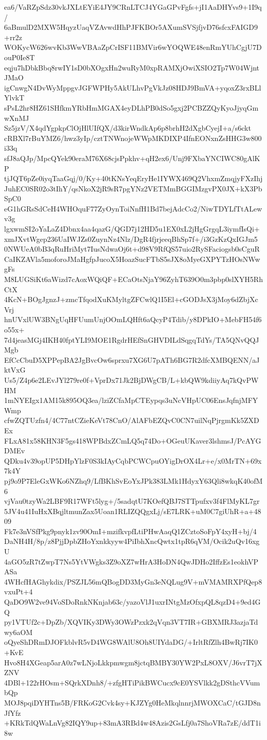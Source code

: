 ea6/VaRZpSdz30vkJXLtEYiE4JY9CRnLTCJ4YGaGPvFgfs+jI1AaDHYvs9+1I9q/
6aBmulD2MXW5HqyzUaqVZAvwdHhPJFKBOr5AXumSVSjfjvD76sfcxFAIGD9+rr2z
WOKycW626wvKb3WwVBAaZpCrISF11BMVir6wYOQWE48enRmYUhCgjU7DouP0Ie8T
eqju7hDbkBbq8rwIY1sD0bXOgxHn2wuRyM0xpRAMXjOwiXSIO2Tp7W04WjntJMaO
igCnwgN4DvWyMppgvJGFWPHy5AkULhvPgVkJz08HDJ9BmVA+yqoxZ3rxBLlYlvkT
sPsL2hr8HZ61SHfkmYRbHmMGAX4eyDLhPB0dSo5gxj2PCBZZQyKyoJjyqGmwXnMJ
Sz5jzV/X4qdYgpkpClOjHlUIfQX/d3kirWndkAp6p8brhH2dXgbCyejI+a/s6ckt
cRBXl7rBuYMZ6/hwz3yIp/cztTNWnojeWWpMKDIXP4IfnEONxnZsHHG3w800i33q
sfJ8aQJp/MpcQYek90eraM76X68cjsPpkhv+qH2ex6/Unj9FXbaYNCIWC80gAlKP
tjJQT6pZe0iyqTaaGqj/0/Ky+40tKNsYeqEryHe1IYWX469Q2VhxmZmqjyFXzIhj
JuhEC0SR02o3tIhY/qsNkoX2jR9sR7pgYNz2VETMmBGGIMzgvPX0JX+kX3PbSpC0
eG1hGRsSdCeH4WHOquF77ZyOynToiNnfH1Bd7bejAdcCo2/NiwTDYLfTtALewv3g
lgxwmSI2oYaLaZ4Dbnx4aa4qazG/QGD7j12HD5u1EX0xL2jHgGrgqL3iymfIsQi+
xmJXvtWgep236UaIWJZs0ZuynNz4Nlz/DgR4fjrjeeqBhSp7f+/i3GzKzQxIGJm5
0NWUeA0bB3qRuHriMyt7IusNdwaOj6t+d98V9RfQS57uio2RySFaciogsb0sCguR
CaIKZAVla5moforoJMaHgfpJucoX5HoazSucFTbS5sJX8oMyeGXPYTzHOsNWwgFs
M8LUGSiKt6aWizd7cAoxWQiQF+ECaOtsNjaY96ZyhT639O0m3pbp0slXYH5RhCtX
4KcN+BOgJgnzJ+zmcTfqodXuKMyltgZFCwlQ1I5El+cGODJsX3jMoy6dZbjXcVrj
hnUVxlUW3BNgUqHFUumUnjOOmLQHft6aQcyP4Tdib/y8DPkIO+MebFH54f6o55x+
7d4jeasMGj4IKH40fptYLI9MOE1RgdrHEfSnGHVDILdSqgqTdYs/TA5QNvQQJMgb
EfCcCbuD5XPPepBA2JgBvcOw6sprxu7XG6U7pATh6BG7R2dfcXMBQENN/aJktVxG
Us5/Z4p6e2LEvJYl279re0f+VprDx71Jk2BjDWgCB/L+kbQW9kdiiyAq7kQvPWHM
1mNYEIgx1AM15k895OQ3ea/lziZCfaMpCTEypqs3uNcVHpUC06EnsJqfnjMFYWmp
cfwZQTUzfn4/4C77ntCZieKeVt78CnO/AlAFbEZQvC0CN7uilNqPjrgmKk5ZXDEx
FLxA81x58KHN3F5gs418WPBdxZCmLQ5q74Do+OGeuUKaver3lshmsJ/PcAYGDMEv
QDku4v39opUP5DHpYlzF0S3kIAyCqbPCWCpuOYigDrOX4Lr+e/x0MrTN+69x7k4Y
pj9o9P7EleGxWKo6NZhq9/LfBKhSvEoYxJPk383LMk1HdyxY63Qli8wkqK40ofM6
vjVau0tzyWa2LBF9R17WFt5lyg+/5sadqtU7KOefQBJ7STTpufxv3f4FlMyKL7gr
5JV4u41IuHxXBqjltmunZax5Uoan1RLIZQQgxLj/sE7LRK+uM0C7giUhR+a+4809
Fk7e3nVSfPkg9pnyk1zv90OmI+mzifkvpfLtiPHwAaqQ1ZCztoSoFpY4xyH+bj/4
DaNH4H/8p/z8PjjDpbZHoYxnkkyyw4PiIbhXncQwtx1tpR6qVM/Ocik2uQv16xgU
4aGO5zR7tZwpT7Ns5YtVWgks3Z9oXZ7wHrA3HoDN4QwJDHo2IffzEs1eokhVPASa
4WHcfHAGhykdix/PSZJL56mQBogDD3MyGn3eNQLug9V+mVMAMRXPfQep8vxuPt+4
QaDO9W2ve94VoSDoRnkNKnjab63c/yazoVlJ1uxrINtgMzOfxpQL8qzD4+9ed4GQ
py1VTUf2c+DpZb/XQVIKy3DWy3OWzPzxk2qVqn3VT7IR+GBXMRJ3azjaTdwy6aOM
oQyeShDRmDJOFkblvR5vD4WG8WAlU8Oh8UIYdaDG/+IrltRfZlh4BwRj7IK0+KvE
Hvo8H4XGeap5arA0z7wLNjoLkkpmwgm8jctqBMBY30YW2PxL8OXV/J6vrT7jXZNV
4DBl+122rHOsm+SQrkXDnh8/+zfgHTiPikBWCucx9cE0YSVlkk2gDSthcVVumbQp
MOJ8pqiDYHTns5B/FRKoG2Cvk4sy+KJZYg0HeMkqlnnrjMWOXCaC/tGJD8nJfYfz
+KRkTdQWaLnVg82IQY9up+83mA3RBd4w48Azis2GsLfj0a7ShoVRa7zE/ddT1i8w
